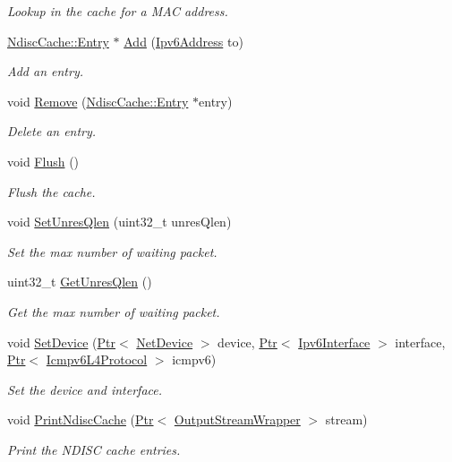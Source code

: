 \begin{DoxyCompactItemize}
\begin{DoxyCompactList}\small\item\em Lookup in the cache for a M\+AC address. \end{DoxyCompactList}\item 
\hyperlink{classns3_1_1NdiscCache_1_1Entry}{Ndisc\+Cache\+::\+Entry} $\ast$ \hyperlink{classns3_1_1NdiscCache_a2be7f4e42e90b272d5335dcb368e51cd}{Add} (\hyperlink{classns3_1_1Ipv6Address}{Ipv6\+Address} to)
\begin{DoxyCompactList}\small\item\em Add an entry. \end{DoxyCompactList}\item 
void \hyperlink{classns3_1_1NdiscCache_a4581af837a386eb8dc5559b7094dbb17}{Remove} (\hyperlink{classns3_1_1NdiscCache_1_1Entry}{Ndisc\+Cache\+::\+Entry} $\ast$entry)
\begin{DoxyCompactList}\small\item\em Delete an entry. \end{DoxyCompactList}\item 
void \hyperlink{classns3_1_1NdiscCache_a2ff148596a97706775544a0597669dfa}{Flush} ()
\begin{DoxyCompactList}\small\item\em Flush the cache. \end{DoxyCompactList}\item 
void \hyperlink{classns3_1_1NdiscCache_ad44190b48098ced8c6c6a76bc19f4d9a}{Set\+Unres\+Qlen} (uint32\+\_\+t unres\+Qlen)
\begin{DoxyCompactList}\small\item\em Set the max number of waiting packet. \end{DoxyCompactList}\item 
uint32\+\_\+t \hyperlink{classns3_1_1NdiscCache_a87b3419db034c9b75a16ebb0ce486579}{Get\+Unres\+Qlen} ()
\begin{DoxyCompactList}\small\item\em Get the max number of waiting packet. \end{DoxyCompactList}\item 
void \hyperlink{classns3_1_1NdiscCache_a13fb5fbb43fc72769ea25a7195187466}{Set\+Device} (\hyperlink{classns3_1_1Ptr}{Ptr}$<$ \hyperlink{classns3_1_1NetDevice}{Net\+Device} $>$ device, \hyperlink{classns3_1_1Ptr}{Ptr}$<$ \hyperlink{classns3_1_1Ipv6Interface}{Ipv6\+Interface} $>$ interface, \hyperlink{classns3_1_1Ptr}{Ptr}$<$ \hyperlink{classns3_1_1Icmpv6L4Protocol}{Icmpv6\+L4\+Protocol} $>$ icmpv6)
\begin{DoxyCompactList}\small\item\em Set the device and interface. \end{DoxyCompactList}\item 
void \hyperlink{classns3_1_1NdiscCache_a65e877dca047412588891aad732a4602}{Print\+Ndisc\+Cache} (\hyperlink{classns3_1_1Ptr}{Ptr}$<$ \hyperlink{classns3_1_1OutputStreamWrapper}{Output\+Stream\+Wrapper} $>$ stream)
\begin{DoxyCompactList}\small\item\em Print the N\+D\+I\+SC cache entries. \end{DoxyCompactList}\end{DoxyCompactItemize}
